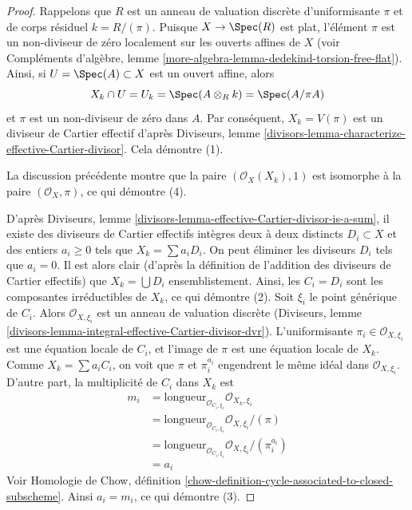 \begin{proof}
Rappelons que $R$ est un anneau de valuation discrète d'uniformisante $\pi$
et de corps résiduel $k = R/(\pi)$. Puisque $X \to \Spec(R)$ est plat,
l'élément $\pi$ est un non-diviseur de zéro localement sur les ouverts affines de $X$
(voir Compléments d'algèbre, lemme
\ref{more-algebra-lemma-dedekind-torsion-free-flat}). Ainsi,
si $U = \Spec(A) \subset X$ est un ouvert affine, alors
$$
X_k \cap U = U_k = \Spec(A \otimes_R k) = \Spec(A/\pi A)
$$
et $\pi$ est un non-diviseur de zéro dans $A$.
Par conséquent, $X_k = V(\pi)$ est un diviseur de Cartier effectif d'après
Diviseurs, lemme \ref{divisors-lemma-characterize-effective-Cartier-divisor}.
Cela démontre (1).

\medskip\noindent
La discussion précédente montre que la paire $(\mathcal{O}_X(X_k), 1)$
est isomorphe à la paire $(\mathcal{O}_X, \pi)$, ce qui démontre (4).

\medskip\noindent
D'après Diviseurs, lemme \ref{divisors-lemma-effective-Cartier-divisor-is-a-sum},
il existe des diviseurs de Cartier effectifs intègres deux à deux distincts
$D_i \subset X$ et des entiers $a_i \geq 0$ tels que $X_k = \sum a_i D_i$.
On peut éliminer les diviseurs $D_i$ tels que $a_i = 0$. Il est alors
clair (d'après la définition de l'addition des diviseurs de Cartier
effectifs) que $X_k = \bigcup D_i$ ensemblistement. Ainsi, les $C_i = D_i$
sont les composantes irréductibles de $X_k$, ce qui démontre (2).
Soit $\xi_i$ le point générique de $C_i$.
Alors $\mathcal{O}_{X, \xi_i}$ est un anneau de valuation discrète
(Diviseurs, lemme \ref{divisors-lemma-integral-effective-Cartier-divisor-dvr}).
L'uniformisante $\pi_i \in \mathcal{O}_{X, \xi_i}$ est une équation locale
de $C_i$, et l'image de $\pi$ est une équation locale de $X_k$.
Comme $X_k = \sum a_i C_i$, on voit que $\pi$ et $\pi_i^{a_i}$
engendrent le même idéal dans $\mathcal{O}_{X, \xi_i}$.
D'autre part, la multiplicité de $C_i$ dans $X_k$ est
$$
\begin{aligned}
m_i
&= \text{longueur}_{\mathcal{O}_{C_i, \xi_i}} \mathcal{O}_{X_k, \xi_i} \\
&= \text{longueur}_{\mathcal{O}_{C_i, \xi_i}}
   \mathcal{O}_{X, \xi_i}/(\pi) \\
&= \text{longueur}_{\mathcal{O}_{C_i, \xi_i}}
   \mathcal{O}_{X, \xi_i}/(\pi_i^{a_i}) \\
&= a_i
\end{aligned}
$$
Voir Homologie de Chow, définition
\ref{chow-definition-cycle-associated-to-closed-subscheme}.
Ainsi $a_i = m_i$, ce qui démontre (3).
\end{proof}


